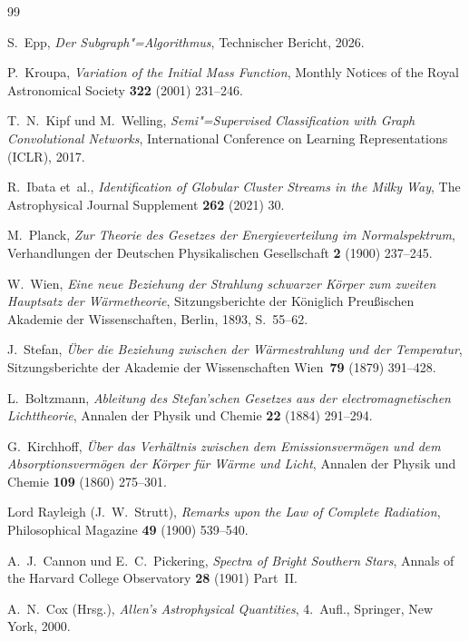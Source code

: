 ﻿\documentclass[a4paper,12pt]{article}
\theoremstyle{definition}
\begin{document}
\begin{thebibliography}{99}

S.~Epp,
\textit{Der Subgraph"=Algorithmus},
Technischer Bericht, 2026.

P.~Kroupa,
\textit{Variation of the Initial Mass Function},
Monthly Notices of the Royal Astronomical Society \textbf{322} (2001) 231--246.

T.~N.~Kipf und M.~Welling,
\textit{Semi"=Supervised Classification with Graph Convolutional Networks},
International Conference on Learning Representations (ICLR), 2017.

R.~Ibata et~al.,
\textit{Identification of Globular Cluster Streams in the Milky Way},
The Astrophysical Journal Supplement \textbf{262} (2021) 30.

M.~Planck,
\textit{Zur Theorie des Gesetzes der Energieverteilung im Normalspektrum},
Verhandlungen der Deutschen Physikalischen Gesellschaft \textbf{2} (1900) 237--245.

W.~Wien,
\textit{Eine neue Beziehung der Strahlung schwarzer Körper zum zweiten
Hauptsatz der Wärmetheorie},
Sitzungsberichte der Königlich Preußischen Akademie der Wissenschaften,
Berlin, 1893, S.~55--62.

J.~Stefan,
\textit{Über die Beziehung zwischen der Wärmestrahlung und der Temperatur},
Sitzungsberichte der Akademie der Wissenschaften Wien~\textbf{79} (1879) 391--428.

L.~Boltzmann,
\textit{Ableitung des Stefan'schen Gesetzes aus der electromagnetischen
Lichttheorie},
Annalen der Physik und Chemie \textbf{22} (1884) 291--294.

G.~Kirchhoff,
\textit{Über das Verhältnis zwischen dem Emissionsvermögen und dem
Absorptionsvermögen der Körper für Wärme und Licht},
Annalen der Physik und Chemie \textbf{109} (1860) 275--301.

Lord Rayleigh (J.~W.~Strutt),
\textit{Remarks upon the Law of Complete Radiation},
Philosophical Magazine \textbf{49} (1900) 539--540.

A.~J.~Cannon und E.~C.~Pickering,
\textit{Spectra of Bright Southern Stars},
Annals of the Harvard College Observatory \textbf{28} (1901) Part~II.

A.~N.~Cox (Hrsg.),
\textit{Allen's Astrophysical Quantities}, 4.~Aufl.,
Springer, New York, 2000.


\end{thebibliography}
\end{document}

